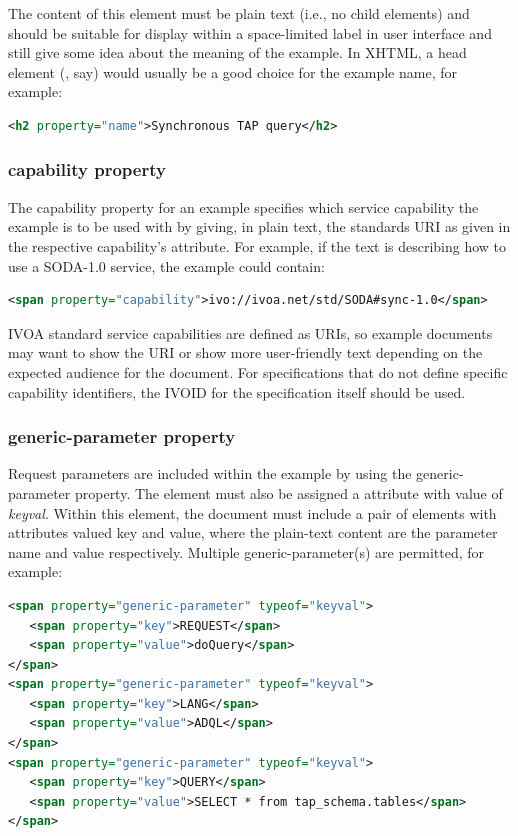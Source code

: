 \documentclass[11pt,letter]{ivoa}
\begin{document}
The content of this element must be plain text (i.e., no child
elements) and
should be suitable for display within a 
space-limited label in user interface and still give some idea about the meaning 
of the example.  In XHTML, a head element (, say) would usually be a good 
choice for the example name, for example:

\begin{lstlisting}[language=XML]
<h2 property="name">Synchronous TAP query</h2>
\end{lstlisting}

\subsubsection{capability property}

The capability property for an example specifies which service capability the 
example is to be used with by giving, in plain text, the standards URI
as given in the respective capability's  attribute. 
For example, if the text is describing how to use a
SODA-1.0 service, the example could contain:

\begin{lstlisting}[language=XML]
<span property="capability">ivo://ivoa.net/std/SODA#sync-1.0</span>
\end{lstlisting}

IVOA standard service capabilities are defined as URIs,  so example documents 
may want to show the URI or show more user-friendly text depending on the 
expected audience for the document. For specifications that do not define 
specific capability identifiers, the IVOID for the specification itself should 
be used.

\subsubsection{generic-parameter property}

Request parameters are included within the example by using the 
generic-parameter property. The element must also be assigned a
 attribute 
with value of \emph{keyval}. Within this element, the document must include a pair of 
elements with  attributes valued key and value, where the plain-text content are 
the parameter name and value respectively. Multiple generic-parameter(s) are 
permitted, for example:

\begin{lstlisting}[language=XML]
<span property="generic-parameter" typeof="keyval">
   <span property="key">REQUEST</span>
   <span property="value">doQuery</span>
</span>
<span property="generic-parameter" typeof="keyval">
   <span property="key">LANG</span>
   <span property="value">ADQL</span>
</span>
<span property="generic-parameter" typeof="keyval">
   <span property="key">QUERY</span>
   <span property="value">SELECT * from tap_schema.tables</span>
</span>
\end{lstlisting}
\end{document}

